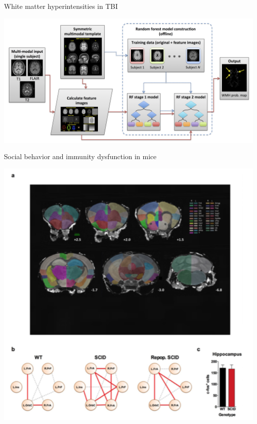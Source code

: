 \documentclass[ignorenonframetext,]{beamer}
\begin{document}
\begin{frame}{White matter hyperintensities in TBI}

\includegraphics{./wmhs/figures/wmhPipeline.png}

\end{frame}

\begin{frame}{Social behavior and immunity dysfunction in mice}

\includegraphics{./antsr/figures/filiano_rsfmri.png}

\end{frame}
\end{document}
